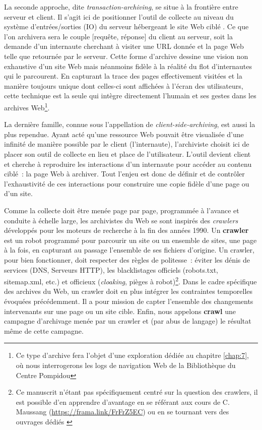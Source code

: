 \documentclass[symmetric,justified,marginals=raggedouter]{tufte-book}
\begin{document}
La seconde approche, dite \textit{transaction-archiving}, se situe à la frontière entre serveur et client. Il s'agit ici de positionner l'outil de collecte au niveau du système d'entrées/sorties (IO) du serveur hébergeant le site Web ciblé \citep{fitch_web_2003}. Ce que l'on archivera sera le couple [requête, réponse] du client au serveur, soit la demande d'un internaute cherchant à visiter une URL donnée et la page Web telle que retournée par le serveur. Cette forme d'archive dessine une vision non exhaustive d'un site Web mais néanmoins fidèle à la réalité du flot d'internautes qui le parcourent. En capturant la trace des pages effectivement visitées et la manière toujours unique dont celles-ci sont affichées à l'écran des utilisateurs, cette technique est la seule qui intègre directement l'humain et ses gestes dans les archives Web\footnote{Ce type d'archive fera l'objet d'une exploration dédiée au chapitre \ref{chap:7}, où nous interrogerons les logs de navigation Web de la Bibliothèque du Centre Pompidou}.  

La dernière famille, connue sous l'appellation de \textit{client-side-archiving}, est aussi la plus rependue. Ayant acté qu'une ressource Web pouvait être visualisée d'une infinité de manière possible par le client (l'internaute), l'archiviste choisit ici de placer son outil de collecte en lieu et place de l'utilisateur. L'outil devient client et cherche à reproduire les interactions d'un internaute pour accéder au contenu ciblé~: la page Web à archiver. Tout l'enjeu est donc de définir et de contrôler l'exhaustivité de ces interactions pour construire une copie fidèle d'une page ou d'un site. 

Comme la collecte doit être menée page par page, programmée à l'avance et conduite à échelle large, les archivistes du Web se sont inspirés des \textit{crawlers} développés pour les moteurs de recherche \citep{pant_crawling_2004} à la fin des années 1990. Un \textbf{crawler} est un robot programmé pour parcourir un site ou un ensemble de sites, une page à la fois, en capturant au passage l'ensemble de ses fichiers d'origine. Un crawler, pour bien fonctionner, doit respecter des règles de politesse~: éviter les dénis de services (DNS, Serveurs HTTP), les blacklistages officiels (robots.txt, sitemap.xml, etc.) et officieux (\textit{cloaking}, pièges à robot)\footnote{Ce manuscrit n'étant pas spécifiquement centré sur la question des crawlers, il est possible d'en apprendre d'avantage en se référant aux cours de C. Maussang (\url{https://frama.link/FrFrZ5EC}) ou en se tournant vers des ouvrages dédiés \citep{chakravarthy_webvigil:_2002,mitchell_web_2015}}. Dans le cadre spécifique des archives du Web, un crawler doit en plus intégrer les contraintes temporelles évoquées précédemment. Il a pour mission de capter l'ensemble des changements intervenants sur une page ou un site cible. Enfin, nous appelons \textbf{crawl} une campagne d'archivage menée par un crawler et (par abus de langage) le résultat même de cette campagne. 
\end{document}

